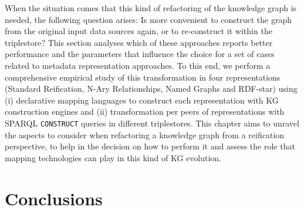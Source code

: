 When the situation comes that this kind of refactoring of the knowledge graph is needed, the following question arises: Is more convenient to construct the graph from the original input data sources again, or to re-construct it within the triplestore? This section analyses which of these approaches reports better performance and the parameters that influence the choice for a set of cases related to metadata representation approaches. 
To this end, we perform a comprehensive empirical study of this transformation in four representations (Standard Reification, N-Ary Relationships, Named Graphs and RDF-star) using (i) declarative mapping languages to construct each representation with KG construction engines and (ii) transformation per peers of representations with SPARQL \texttt{CONSTRUCT} queries in different triplestores. 
This chapter aims to unravel the aspects to consider when refactoring a knowledge graph from a reification perspective, to help in the decision on how to perform it and assess the role that mapping technologies can play in this kind of KG evolution. %



\section{Conclusions}

